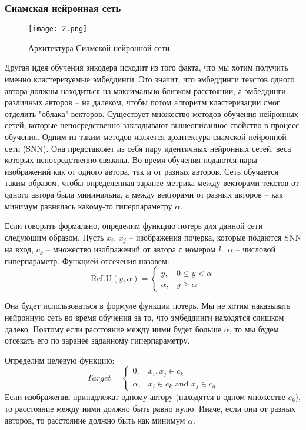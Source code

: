 \subsubsection{Сиамская нейронная сеть}

    \begin{figure}[htbp]
        \centering
        \texttt{[image: 2.png]}
        \caption{Архитектура Сиамской нейронной сети.}
        \label{fig:snn}
    \end{figure}

    Другая идея обучения энкодера исходит из того факта, что мы хотим получить именно кластеризуемые эмбеддинги. Это значит, что эмбеддинги текстов одного автора должны находиться на максимально близком расстоянии, а эмбеддинги различных авторов -- на далеком, чтобы потом алгоритм кластеризации смог отделить "облака" векторов. Существует множество методов обучения нейронных сетей, которые непосредственно закладывают вышеописанное свойство в процесс обучения. Одним из таким методов является архитектура сиамской нейронной сети (SNN). Она представляет из себя пару идентичных нейронных сетей, веса которых непосредственно связаны. Во время обучения подаются пары изображений как от одного автора, так и от разных авторов. Сеть обучается таким образом, чтобы определенная заранее метрика между векторами текстов от одного автора была минимальна, а между векторами от разных авторов -- как минимум равнялась какому-то гиперпараметру $\alpha$. 

    Если говорить формально, определим функцию потерь для данной сети следующим образом. Пусть
$x_i$, $x_j$ -- изображения почерка, которые подаются SNN на вход, $c_k$ -- множество изображений от автора с номером $k$, $\alpha$ -- числовой гиперпараметр. Функцией отсечения назовем: 
$$
    \text{ReLU}(y, \alpha) = 
\begin{cases}
    y,& 0 \le y < \alpha \\
    \alpha,& y \geq \alpha
\end{cases}
$$

\bigbreak
\noindent
Она будет использоваться в формуле функции потерь. Мы не хотим наказывать нейронную сеть во время обучения за то, что эмбеддинги находятся слишком далеко. Поэтому если расстояние между ними будет больше $\alpha$, то мы будем отсекать его по заранее заданному гиперпараметру. 

\noindent
Определим целевую функцию:
$$
Target =
\begin{cases}
    0,& x_i, x_j \in c_k \\
    \alpha,& x_i \in c_k \text{ and } x_j \in c_q
\end{cases}
$$
Если изображения принадлежат одному автору (находятся в одном множестве $c_k$), то расстояние между ними должно быть равно нулю. Иначе, если они от разных авторов, то расстояние должно быть как минимум $\alpha$. 

